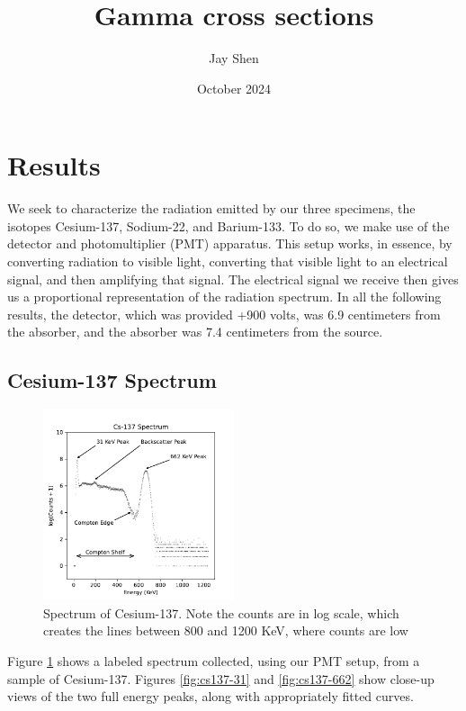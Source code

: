 \documentclass[12pt, letterpaper]{article}
\title{Gamma cross sections}
\author{Jay Shen}
\date{October 2024}
\begin{document}
\maketitle

\section{Results}

We seek to characterize the radiation emitted by our three specimens, the isotopes Cesium-137, Sodium-22, and Barium-133. To do so, we make use of the detector and photomultiplier (PMT) apparatus. This setup works, in essence, by converting radiation to visible light, converting that visible light to an electrical signal, and then amplifying that signal. The electrical signal we receive then gives us a proportional representation of the radiation spectrum. In all the following results, the detector, which was provided +900 volts, was 6.9 centimeters from the absorber, and the absorber was 7.4 centimeters from the source. 

\subsection{Cesium-137 Spectrum}

\begin{figure}[h]
    \centering
    \includegraphics[width=0.5\textwidth]{experiment1/figures/cs137/spectrum.pdf}
    \caption{Spectrum of Cesium-137. Note the counts are in log scale, which creates the lines between 800 and 1200 KeV, where counts are low}
    \label{fig:cs137-spectrum}
\end{figure}

Figure \ref{fig:cs137-spectrum} shows a labeled spectrum collected, using our PMT setup, from a sample of Cesium-137. Figures \ref{fig:cs137-31} and \ref{fig:cs137-662} show close-up views of the two full energy peaks, along with appropriately fitted curves. 
\end{document}
